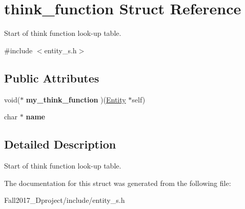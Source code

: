 \hypertarget{structthink__function}{}\section{think\+\_\+function Struct Reference}
\label{structthink__function}


Start of think function look-\/up table.  




{\ttfamily \#include $<$entity\+\_\+s.\+h$>$}

\subsection*{Public Attributes}
\begin{DoxyCompactItemize}
\item 
\mbox{\label{structthink__function_a4ddefcc7af9cb96884b6d06e926f3ed1}} 
void($\ast$ {\bfseries my\+\_\+think\+\_\+function} )(\hyperlink{structentity__s}{Entity} $\ast$self)
\item 
\mbox{\label{structthink__function_a086a55bb85d58ef5423605bd4a53faee}} 
char $\ast$ {\bfseries name}
\end{DoxyCompactItemize}


\subsection{Detailed Description}
Start of think function look-\/up table. 

The documentation for this struct was generated from the following file\+:\begin{DoxyCompactItemize}
\item 
Fall2017\+\_\+Dproject/include/entity\+\_\+s.\+h\end{DoxyCompactItemize}
